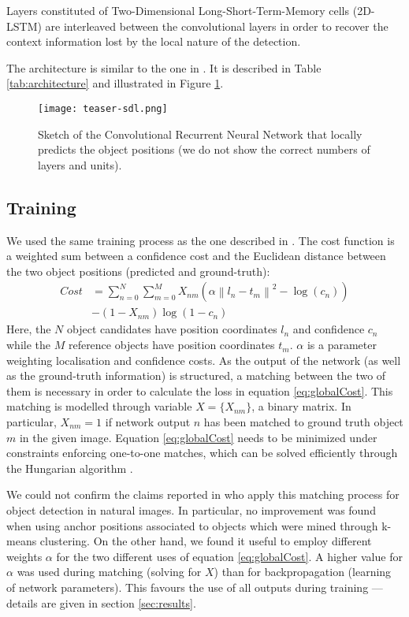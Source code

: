 \documentclass[conference]{IEEEtran}
\begin{document}
Layers constituted of Two-Dimensional Long-Short-Term-Memory cells (2D-LSTM) \cite{Graves2DLSTM2009} are interleaved between the convolutional layers in order to recover the context information lost by the local nature of the detection. 

The architecture is similar to the one in \cite{moysset2016learning}. It is described in Table \ref{tab:architecture} and illustrated in Figure \ref{fig:archi}.

\begin{figure}[!t]
  \centering
  \texttt{[image: teaser-sdl.png]}
  \caption{Sketch of the Convolutional Recurrent Neural Network that locally predicts the object positions (we do not show the correct numbers of layers and units).}
  \label{fig:archi}
\end{figure}

\subsection{Training}
We used the same training process as the one described in \cite{erhan2014scalable}. The cost function is a weighted sum between a confidence cost and the Euclidean distance between the two object positions (predicted and ground-truth):
\begin{equation}
\label{eq:globalCost}
\begin{split}
Cost & = \sum_{n=0}^N \sum_{m=0}^M X_{nm} \left( \alpha \left\|l_{n}-t_{m}\right\|^2 - \log(c_{n})\right) \\
 & - (1 - X_{nm}) \log(1-c_{n})
\end{split}
\end{equation}
Here, the $N$ object candidates have position coordinates $l_{n}$ and confidence $c_{n}$ while the $M$ reference objects have position coordinates $t_{m}$. $\alpha$ is a parameter weighting localisation and confidence costs.  As the output of the network (as well as the ground-truth information) is structured, a matching between the two of them is necessary in order to calculate the loss in equation \ref{eq:globalCost}. This matching is modelled through variable $X{=}\{X_{nm}\}$, a binary matrix. In particular, $X_{nm}{=}1$ if network output $n$ has been matched to ground truth object $m$ in the given image. Equation \ref{eq:globalCost} needs to be minimized under constraints enforcing one-to-one matches, which can be solved efficiently through the Hungarian algorithm \cite{munkres1957algorithms}.

We could not confirm the claims reported in \cite{erhan2014scalable} who apply this matching process for object detection in natural images. In particular, no improvement was found when using anchor positions associated to  objects which were mined through k-means clustering. On the other hand, we found it useful to employ different weights $\alpha$ for the two different uses of equation \ref{eq:globalCost}. A higher value for $\alpha$ was used during matching (solving for $X$) than for backpropagation (learning of network parameters). This favours the use of all outputs during training --- details are given in section \ref{sec:results}.
\end{document}
